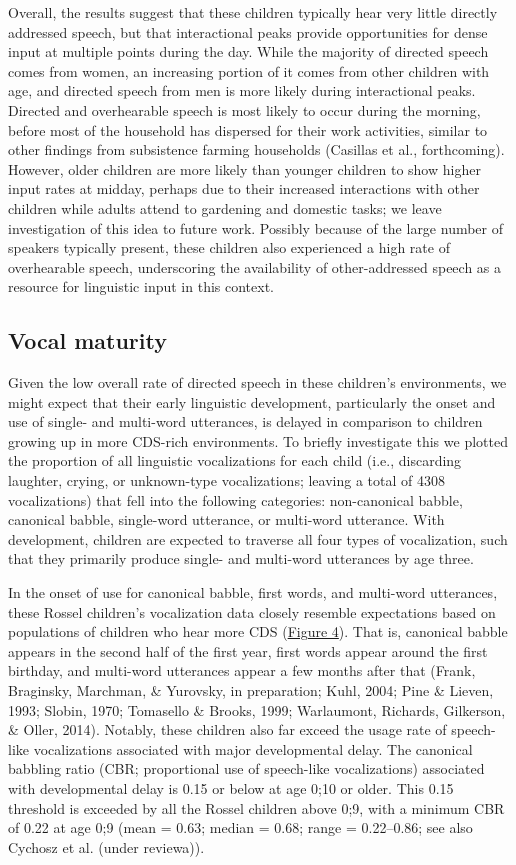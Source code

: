 \documentclass[,man,floatsintext]{apa6}
\begin{document}
Overall, the results suggest that these children typically hear very
little directly addressed speech, but that interactional peaks provide
opportunities for dense input at multiple points during the day. While
the majority of directed speech comes from women, an increasing portion
of it comes from other children with age, and directed speech from men
is more likely during interactional peaks. Directed and overhearable
speech is most likely to occur during the morning, before most of the
household has dispersed for their work activities, similar to other
findings from subsistence farming households (Casillas et al.,
forthcoming). However, older children are more likely than younger
children to show higher input rates at midday, perhaps due to their
increased interactions with other children while adults attend to
gardening and domestic tasks; we leave investigation of this idea to
future work. Possibly because of the large number of speakers typically
present, these children also experienced a high rate of overhearable
speech, underscoring the availability of other-addressed speech as a
resource for linguistic input in this context.

\subsection{Vocal maturity}\label{vocal-maturity}

Given the low overall rate of directed speech in these children's
environments, we might expect that their early linguistic development,
particularly the onset and use of single- and multi-word utterances, is
delayed in comparison to children growing up in more CDS-rich
environments. To briefly investigate this we plotted the proportion of
all linguistic vocalizations for each child (i.e., discarding laughter,
crying, or unknown-type vocalizations; leaving a total of 4308
vocalizations) that fell into the following categories: non-canonical
babble, canonical babble, single-word utterance, or multi-word
utterance. With development, children are expected to traverse all four
types of vocalization, such that they primarily produce single- and
multi-word utterances by age three.

In the onset of use for canonical babble, first words, and multi-word
utterances, these Rossel children's vocalization data closely resemble
expectations based on populations of children who hear more CDS
(\protect\hyperlink{fig4}{Figure 4}). That is, canonical babble appears
in the second half of the first year, first words appear around the
first birthday, and multi-word utterances appear a few months after that
(Frank, Braginsky, Marchman, \& Yurovsky, in preparation; Kuhl, 2004;
Pine \& Lieven, 1993; Slobin, 1970; Tomasello \& Brooks, 1999;
Warlaumont, Richards, Gilkerson, \& Oller, 2014). Notably, these
children also far exceed the usage rate of speech-like vocalizations
associated with major developmental delay. The canonical babbling ratio
(CBR; proportional use of speech-like vocalizations) associated with
developmental delay is 0.15 or below at age 0;10 or older. This 0.15
threshold is exceeded by all the Rossel children above 0;9, with a
minimum CBR of 0.22 at age 0;9 (mean = 0.63; median = 0.68; range =
0.22--0.86; see also Cychosz et al. (under reviewa)).
\end{document}
